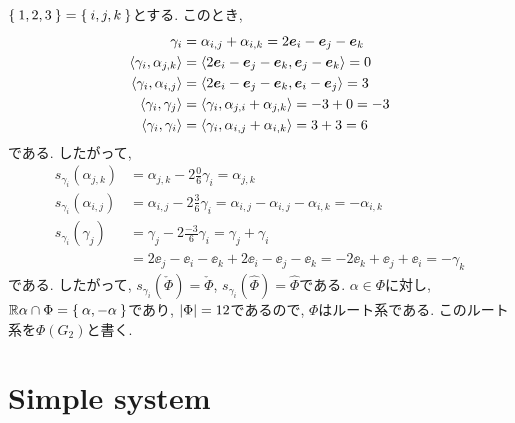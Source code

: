 $\Set{1,2,3}=\Set{i,j,k}$とする.
このとき,
\begin{align*}
  \gamma_{i}&=\alpha_{i,j}+\alpha_{i,k}=2\boldsymbol{e}_i-\boldsymbol{e}_j-\boldsymbol{e}_k\\
  \Braket{\gamma_{i},\alpha_{j,k}}
  &=\Braket{2\boldsymbol{e}_i-\boldsymbol{e}_j-\boldsymbol{e}_k,\boldsymbol{e}_j-\boldsymbol{e}_k}=0\\
  \Braket{\gamma_{i},\alpha_{i,j}}
  &=\Braket{2\boldsymbol{e}_i-\boldsymbol{e}_j-\boldsymbol{e}_k,\boldsymbol{e}_i-\boldsymbol{e}_j}=3\\
  \Braket{\gamma_{i},\gamma_{j}}
  &=\Braket{\gamma_i,\alpha_{j,i}+\alpha_{j,k}}=-3+0=-3\\
  \Braket{\gamma_{i},\gamma_{i}}
  &=\Braket{\gamma_i,\alpha_{i,j}+\alpha_{i,k}}=3+3=6
\end{align*}
である. したがって,
\begin{align*}
  s_{\gamma_{i}}(\alpha_{j,k})&=\alpha_{j,k}-2\frac{0}{6}\gamma_i
  =\alpha_{j,k}\\
  s_{\gamma_{i}}(\alpha_{i,j})&=\alpha_{i,j}-2\frac{3}{6}\gamma_i
  =\alpha_{i,j}-\alpha_{i,j}-\alpha_{i,k}=-\alpha_{i,k}\\
  s_{\gamma_{i}}(\gamma_{j})&=\gamma_{j}-2\frac{-3}{6}\gamma_i
  =\gamma_j+\gamma_i\\
  &=2\ee_j-\ee_i-\ee_k+2\ee_i-\ee_j-\ee_k
  =-2\ee_k+\ee_j+\ee_i=-\gamma_k
\end{align*}
である.
したがって,
$s_{\gamma_i}(\check\Phi)=\check\Phi$,
$s_{\gamma_i}(\hat\Phi)=\hat\Phi$である.
$\alpha\in\Phi$に対し, $\mathbb{R}\alpha\cap\Phi=\Set{\alpha,-\alpha}$であり,
$\left|\Phi\right|=12$であるので, $\Phi$はルート系である.
このルート系を$\Phi(G_2)$と書く.


\chapter{Simple system}
